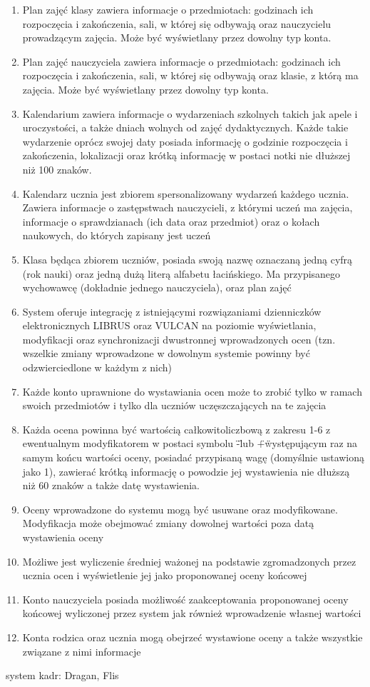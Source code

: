 \documentclass{article}
\begin{document}
\begin{enumerate}
    \item Plan zajęć klasy zawiera informacje o przedmiotach: godzinach ich rozpoczęcia i zakończenia, sali, w której się odbywają oraz nauczycielu prowadzącym zajęcia. Może być wyświetlany przez dowolny typ konta.
    \item Plan zajęć nauczyciela zawiera informacje o przedmiotach: godzinach ich rozpoczęcia i zakończenia, sali, w której się odbywają oraz klasie, z którą ma zajęcia. Może być wyświetlany przez dowolny typ konta.
    \item Kalendarium zawiera informacje o wydarzeniach szkolnych takich jak apele i uroczystości, a także dniach wolnych od zajęć dydaktycznych. Każde takie wydarzenie oprócz swojej daty posiada informację o godzinie rozpoczęcia i zakończenia, lokalizacji oraz krótką informację w postaci notki nie dłuższej niż 100 znaków.
    \item Kalendarz ucznia jest zbiorem spersonalizowany wydarzeń każdego ucznia. Zawiera informacje o zastępstwach nauczycieli, z którymi uczeń ma zajęcia, informacje o sprawdzianach (ich data oraz przedmiot) oraz o kołach naukowych, do których zapisany jest uczeń
    \item Klasa będąca zbiorem uczniów, posiada swoją nazwę oznaczaną jedną cyfrą (rok nauki) oraz jedną dużą literą alfabetu łacińskiego. Ma przypisanego wychowawcę (dokładnie jednego nauczyciela), oraz plan zajęć
    \item System oferuje integrację z istniejącymi rozwiązaniami dzienniczków elektronicznych LIBRUS oraz VULCAN na poziomie wyświetlania, modyfikacji oraz synchronizacji dwustronnej wprowadzonych ocen (tzn. wszelkie zmiany wprowadzone w dowolnym systemie powinny być odzwierciedlone w każdym z nich)
    \item Każde konto uprawnione do wystawiania ocen może to zrobić tylko w ramach swoich przedmiotów i tylko dla uczniów uczęszczających na te zajęcia
    \item Każda ocena powinna być wartością całkowitoliczbową z zakresu 1-6 z ewentualnym modyfikatorem w postaci symbolu \"-\" lub \"+\" występującym raz na samym końcu wartości oceny, posiadać przypisaną wagę (domyślnie ustawioną jako 1), zawierać krótką informację o powodzie jej wystawienia nie dłuższą niż 60 znaków a także datę wystawienia.
    \item Oceny wprowadzone do systemu mogą być usuwane oraz modyfikowane. Modyfikacja może obejmować zmiany dowolnej wartości poza datą wystawienia oceny
    \item Możliwe jest wyliczenie średniej ważonej na podstawie zgromadzonych przez ucznia ocen i wyświetlenie jej jako proponowanej oceny końcowej
    \item Konto nauczyciela posiada możliwość zaakceptowania proponowanej oceny końcowej wyliczonej przez system jak również wprowadzenie własnej wartości
    \item Konta rodzica oraz ucznia mogą obejrzeć wystawione oceny a także wszystkie związane z nimi informacje
\end{enumerate}
system kadr: Dragan, Flis
\end{document}
